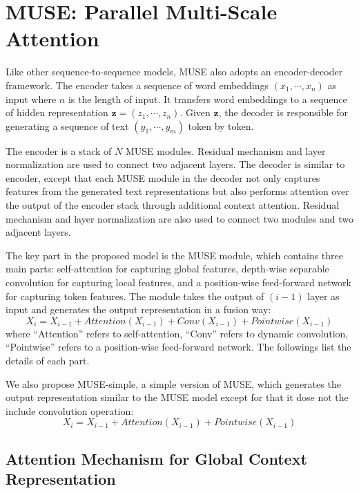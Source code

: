 \documentclass{article} \usepackage{iclr2020_conference,times}
\begin{document}
\section{MUSE: Parallel Multi-Scale Attention}






Like other sequence-to-sequence models, MUSE also adopts an encoder-decoder framework. The encoder takes a sequence of word embeddings $(x_1, \cdots, x_n)$ as input where $n$ is the length of input. It transfers word embeddings to a sequence of hidden representation $\boldsymbol{z} = (z_1, \cdots, z_n)$. Given $\boldsymbol{z}$, the decoder is responsible for generating a sequence of text $(y_1, \cdots, y_m)$ token by token. 

The encoder is a stack of $N$  MUSE modules. Residual mechanism and layer normalization are used to connect two adjacent layers.  
The decoder is similar to encoder, except that each MUSE module in the decoder not only captures features from the generated text representations  but also performs attention over the output of the encoder stack through additional context attention. Residual mechanism and layer normalization are also used to connect two modules and two adjacent layers. 



The key part in the proposed model is the MUSE module, which contains three main parts: self-attention for capturing global features, depth-wise separable convolution for capturing local features, and a position-wise feed-forward network for capturing token features. The module takes the output of $(i-1)$ layer as input and generates the output representation in a fusion way:
\begin{equation}
X_{i} = X_{i-1} + Attention(X_{i-1}) + Conv(X_{i-1}) + Pointwise(X_{i-1})
\end{equation}
where  ``Attention'' refers to self-attention, ``Conv'' refers to dynamic convolution, ``Pointwise'' refers to a position-wise feed-forward network. The followings list the details of each part. 

We also propose MUSE-simple, a simple version of MUSE, which generates the output representation similar to the MUSE model except for that it dose not the include convolution operation:
\begin{equation}
X_{i} = X_{i-1} + Attention(X_{i-1}) + Pointwise(X_{i-1})
\end{equation}

\subsection{Attention Mechanism for Global Context Representation}
\end{document}
